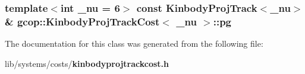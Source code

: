 \subsubsection[{pg}]{\setlength{\rightskip}{0pt plus 5cm}template$<$int \-\_\-nu = 6$>$ const {\bf \-Kinbody\-Proj\-Track}$<$\-\_\-nu$>$\& {\bf gcop\-::\-Kinbody\-Proj\-Track\-Cost}$<$ \-\_\-nu $>$\-::{\bf pg}}\label{classgcop_1_1KinbodyProjTrackCost_af7ba21add6616ce47e949e379f4b1d95}


\-The documentation for this class was generated from the following file\-:\begin{DoxyCompactItemize}
\item 
lib/systems/costs/{\bf kinbodyprojtrackcost.\-h}\end{DoxyCompactItemize}
